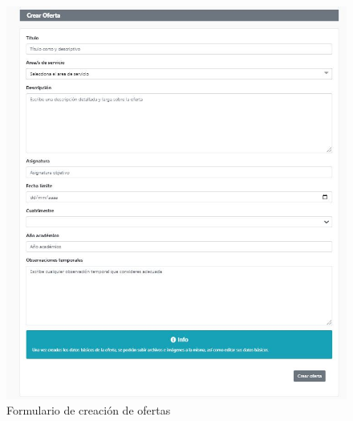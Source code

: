 \documentclass[11pt]{book}
\begin{document}
\begin{figure}[t]
	\centering
	\includegraphics[scale=0.9]{oferta}
	\caption{Formulario de creación de ofertas}
\end{figure}
\end{document}
